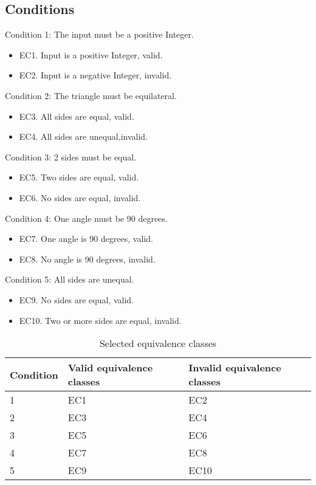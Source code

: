 \subsection{Conditions}
Condition 1: The input must be a positive Integer.
\begin{itemize}
	\item EC1. Input is a positive Integer, valid.
	\item EC2. Input is a negative Integer, invalid.
\end{itemize}

Condition 2: The triangle must be equilateral.
\begin{itemize}
	\item EC3. All sides are equal, valid. 
	\item EC4. All sides are unequal,invalid. 
\end{itemize}

Condition 3: 2 sides must be equal.  
\begin{itemize}
	\item EC5. Two sides are equal, valid. 
	\item EC6. No sides are equal, invalid. 
\end{itemize}

Condition 4: One angle must be 90 degrees. 
\begin{itemize}
	\item EC7. One angle is 90 degrees, valid. 
	\item EC8. No angle is 90 degrees, invalid. 
\end{itemize}

Condition 5: All sides are unequal. 
\begin{itemize}
	\item EC9. No sides are equal, valid. 
	\item EC10. Two or more sides are equal, invalid. 
\end{itemize}


\begin{table}
	\centering
	\label{classestable}
	\caption{Selected equivalence classes}
    \begin{tabular}{|l|l|l|}
        \hline
        Condition  & Valid equivalence classes & Invalid equivalence classes \\ \hline
        1          & EC1                       & EC2                         \\ 
        2          & EC3                       & EC4                         \\ 
        3          & EC5                       & EC6                         \\ 
        4          & EC7                       & EC8                         \\ 
        5          & EC9                       & EC10                        \\
        \hline
    \end{tabular}
\end{table}








